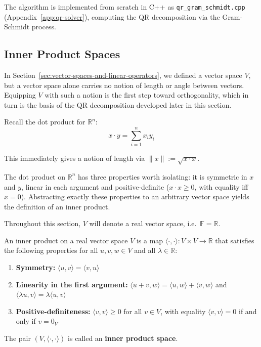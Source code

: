 	The algorithm is implemented from scratch in C++ as \texttt{qr\_gram\_schmidt.cpp} (Appendix~\ref{app:qr-solver}), computing the QR decomposition via the Gram-Schmidt process.
	
	\subsection{Inner Product Spaces}
		
		\indent \indent In Section~\ref{sec:vector-spaces-and-linear-operators}, we defined a vector space $V$, but a vector space alone carries no notion of length or angle between vectors. Equipping $V$ with such a notion is the first step toward orthogonality, which in turn is the basis of the QR decomposition developed later in this section.
		
		Recall the dot product for $\mathbb{R}^n$:
		\[
			x \cdot y = \sum_{i=1}^{n} x_i y_i
		\]
		
		This immediately gives a notion of length via $\|x\| := \sqrt{x \cdot x}$.
		
		The dot product on $\mathbb{R}^n$ has three properties worth isolating: it is symmetric in $x$ and $y$, linear in each argument and positive-definite ($x \cdot x \ge 0$, with equality iff $x=0$). Abstracting exactly these properties to an arbitrary vector space yields the definition of an inner product.
		
		Throughout this section, $V$ will denote a real vector space, i.e.\ $\mathbb{F} = \mathbb{R}$.
		
		\begin{definition}
			\label{def:inner-product}
			An inner product on a real vector space $V$ is a map $\langle \cdot, \cdot \rangle : V \times V \to \mathbb{R}$ that satisfies the following properties for all $u, v, w \in V$ and all $\lambda \in \mathbb{R}$:
			
			\begin{enumerate}[label=(IP\arabic*)]
				\item \label{ax:IP1} \textbf{Symmetry:} $\langle u, v \rangle = \langle v, u \rangle$
				\item \label{ax:IP2} \textbf{Linearity in the first argument:} $\langle u + v, w \rangle = \langle u, w \rangle + \langle v, w \rangle$ and $\langle \lambda u, v \rangle = \lambda \langle u, v \rangle$
				\item \label{ax:IP3} \textbf{Positive-definiteness:} $\langle v, v \rangle \ge 0$ for all $v \in V$, with equality $\langle v, v \rangle = 0$ if and only if $v = 0_V$
			\end{enumerate}
			
			The pair $(V, \langle \cdot, \cdot \rangle)$ is called an \textbf{inner product space}.
			
		\end{definition}
		
